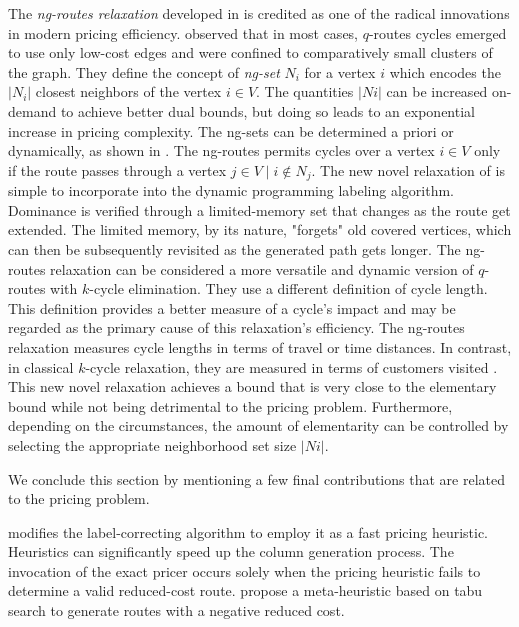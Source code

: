 The \textit{ng-routes relaxation} developed in \textcite{baldacci2011}
is credited as one of the radical innovations in modern pricing efficiency.
\citeauthor{baldacci2011} observed that in most cases,
$q$-routes cycles emerged to use only low-cost edges
and were confined to comparatively small clusters of the graph.
They define the concept of \textit{ng-set} $N_i$ for a vertex $i$
which encodes the $|N_i|$ closest neighbors of the vertex $i \in V$.
The quantities $|N i|$ can be increased on-demand to achieve better dual bounds,
but doing so leads to an exponential increase in pricing complexity.
The ng-sets can be determined a priori or dynamically, as shown in \textcite{roberti2014}.
The ng-routes permits cycles over a vertex $i \in V$ only if the route
passes through a vertex $j \in V \mid i \notin N_j$.
The new novel relaxation of \citeauthor{baldacci2011}
is simple to incorporate into the dynamic programming labeling algorithm.
Dominance is verified through a limited-memory set
that changes as the route get extended.
The limited memory, by its nature,
"forgets" old covered vertices,
which can then be subsequently revisited
as the generated path gets longer.
The ng-routes relaxation can be considered a more versatile and dynamic version
of $q$-routes with $k$-cycle elimination.
They use a different definition of cycle length.
This definition provides a better measure of a cycle's impact
and may be regarded as the primary cause of this relaxation's efficiency.
The ng-routes relaxation measures cycle lengths in terms of travel or time distances.
In contrast, in classical $k$-cycle relaxation,
they are measured in terms of customers visited \parencite{contardo2014}.
This new novel relaxation achieves a bound that is very close to the elementary bound
while not being detrimental to the pricing problem.
Furthermore, depending on the circumstances,
the amount of elementarity can be controlled by selecting the appropriate
neighborhood set size $|N i|$.

\medskip

We conclude this section by mentioning a few final contributions
that are related to the pricing problem.

\textcite{fukasawa2006} modifies the label-correcting algorithm
to employ it as a fast pricing heuristic.
Heuristics can significantly speed up the column generation process.
The invocation of the exact pricer occurs solely when the pricing heuristic
fails to determine a valid reduced-cost route.
\textcite{desaulniers2008, archetti2011} propose a meta-heuristic based on tabu search
to generate routes with a negative reduced cost.


